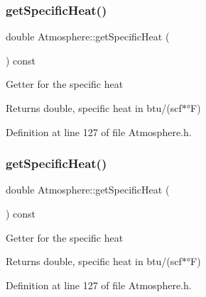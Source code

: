 \mbox{\label{class_atmosphere_a59802a10861a58ab0f0f4e0ab8671e14}} 
\subsubsection{\texorpdfstring{get\+Specific\+Heat()}{getSpecificHeat()}\hspace{0.1cm}{\footnotesize\ttfamily [2/3]}}
{\footnotesize\ttfamily double Atmosphere\+::get\+Specific\+Heat (\begin{DoxyParamCaption}{ }\end{DoxyParamCaption}) const\hspace{0.3cm}{\ttfamily [inline]}}

Getter for the specific heat \begin{DoxyReturn}{Returns}
double, specific heat in btu/(scf$\ast$°F) 
\end{DoxyReturn}


Definition at line 127 of file Atmosphere.\+h.

\mbox{\label{class_atmosphere_a59802a10861a58ab0f0f4e0ab8671e14}} 
\subsubsection{\texorpdfstring{get\+Specific\+Heat()}{getSpecificHeat()}\hspace{0.1cm}{\footnotesize\ttfamily [3/3]}}
{\footnotesize\ttfamily double Atmosphere\+::get\+Specific\+Heat (\begin{DoxyParamCaption}{ }\end{DoxyParamCaption}) const\hspace{0.3cm}{\ttfamily [inline]}}

Getter for the specific heat \begin{DoxyReturn}{Returns}
double, specific heat in btu/(scf$\ast$°F) 
\end{DoxyReturn}


Definition at line 127 of file Atmosphere.\+h.

\mbox{\label{class_atmosphere_a3ac0fb0d4fc92edc690e44b40b7018c2}} 
